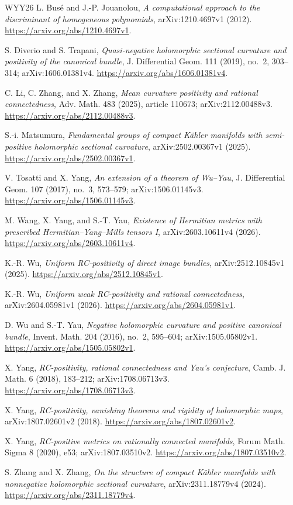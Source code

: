 \documentclass[12pt]{amsart}
\theoremstyle{definition}
\theoremstyle{remark}
\numberwithin{equation}{section}
\begin{document}
\renewcommand{\refname}{参考文献}
\begin{thebibliography}{WYY26}
 L. Bus\'e and J.-P. Jouanolou, \emph{A computational approach to the discriminant of homogeneous polynomials}, arXiv:1210.4697v1 (2012). \url{https://arxiv.org/abs/1210.4697v1}.

 S. Diverio and S. Trapani, \emph{Quasi-negative holomorphic sectional curvature and positivity of the canonical bundle}, J. Differential Geom. 111 (2019), no.~2, 303--314; arXiv:1606.01381v4. \url{https://arxiv.org/abs/1606.01381v4}.

 C. Li, C. Zhang, and X. Zhang, \emph{Mean curvature positivity and rational connectedness}, Adv. Math. 483 (2025), article 110673; arXiv:2112.00488v3. \url{https://arxiv.org/abs/2112.00488v3}.

 S.-i. Matsumura, \emph{Fundamental groups of compact K\"ahler manifolds with semi-positive holomorphic sectional curvature}, arXiv:2502.00367v1 (2025). \url{https://arxiv.org/abs/2502.00367v1}.

 V. Tosatti and X. Yang, \emph{An extension of a theorem of Wu--Yau}, J. Differential Geom. 107 (2017), no.~3, 573--579; arXiv:1506.01145v3. \url{https://arxiv.org/abs/1506.01145v3}.

 M. Wang, X. Yang, and S.-T. Yau, \emph{Existence of Hermitian metrics with prescribed Hermitian--Yang--Mills tensors I}, arXiv:2603.10611v4 (2026). \url{https://arxiv.org/abs/2603.10611v4}.

 K.-R. Wu, \emph{Uniform RC-positivity of direct image bundles}, arXiv:2512.10845v1 (2025). \url{https://arxiv.org/abs/2512.10845v1}.

 K.-R. Wu, \emph{Uniform weak RC-positivity and rational connectedness}, arXiv:2604.05981v1 (2026). \url{https://arxiv.org/abs/2604.05981v1}.

 D. Wu and S.-T. Yau, \emph{Negative holomorphic curvature and positive canonical bundle}, Invent. Math. 204 (2016), no.~2, 595--604; arXiv:1505.05802v1. \url{https://arxiv.org/abs/1505.05802v1}.

 X. Yang, \emph{RC-positivity, rational connectedness and Yau's conjecture}, Camb. J. Math. 6 (2018), 183--212; arXiv:1708.06713v3. \url{https://arxiv.org/abs/1708.06713v3}.

 X. Yang, \emph{RC-positivity, vanishing theorems and rigidity of holomorphic maps}, arXiv:1807.02601v2 (2018). \url{https://arxiv.org/abs/1807.02601v2}.

 X. Yang, \emph{RC-positive metrics on rationally connected manifolds}, Forum Math. Sigma 8 (2020), e53; arXiv:1807.03510v2. \url{https://arxiv.org/abs/1807.03510v2}.

 S. Zhang and X. Zhang, \emph{On the structure of compact K\"ahler manifolds with nonnegative holomorphic sectional curvature}, arXiv:2311.18779v4 (2024). \url{https://arxiv.org/abs/2311.18779v4}.

\end{thebibliography}
\end{document}
